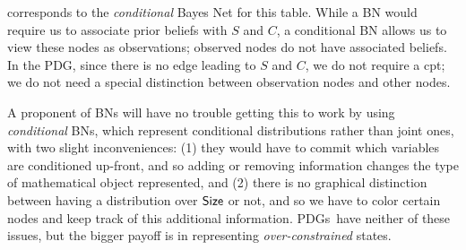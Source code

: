\documentclass{article}
\newcommand{\MN}{PDG}
\newcommand{\MNs}{\MN s}
\numberwithin{equation}{section}
\begin{document}
\begin{notfocus}
\begin{example}
		corresponds to the \emph{conditional} Bayes Net \parencite{koller2009probabilistic} for this table.
		While a BN would require us to associate prior beliefs with $S$ and
		$C$, a conditional BN allows us to view these nodes as
		observations; observed nodes do not have associated beliefs.
		In the \MN, since there is no edge leading to $S$ and $C$, we
		do not require a cpt; we do not need a special distinction between
		observation nodes and other nodes.
				
		\begin{vfull}
			A proponent of BNs will have no trouble getting this to work by using \emph{conditional} BNs, which represent conditional distributions rather than joint ones, with two slight inconveniences: (1) they would have to commit which variables are conditioned up-front, and so adding or removing information changes the type of mathematical object represented, and (2) there is no graphical distinction between having a distribution over $\sf Size$ or not, and so we have to color certain nodes and keep track of this additional information. \MNs\ have neither of these issues, but the bigger payoff is in representing \textit{over-constrained} states.
		\end{vfull}
	

\end{example}
\end{notfocus}
\end{document}
